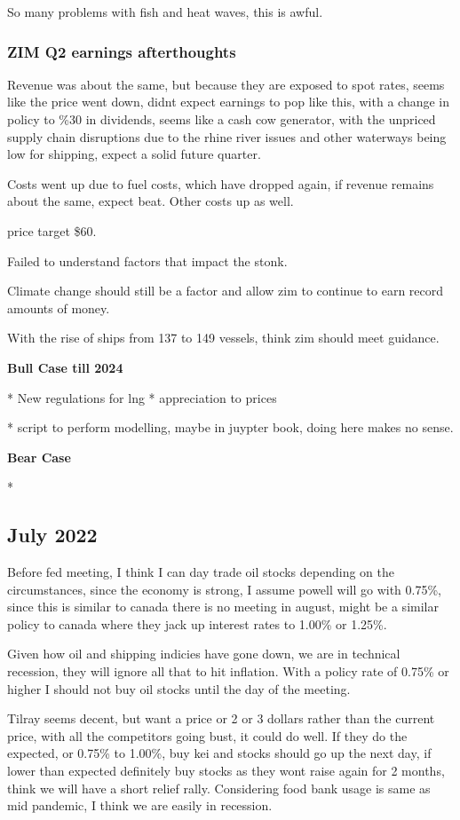 So many problems with fish and heat waves, this is awful.

\subsubsection{ZIM Q2 earnings afterthoughts} 

Revenue was about the same, but because they are exposed to spot rates, seems like the price went down, didnt expect earnings to pop like this, with a change in policy to \%30 in dividends, seems like a cash cow generator, with the unpriced supply chain disruptions due to the rhine river issues and other waterways being low for shipping, expect a solid future quarter. 

Costs went up due to fuel costs, which have dropped again, if revenue remains about the same, expect beat. Other costs up as well.

price target \$60.

Failed to understand factors that impact the stonk.

Climate change should still be a factor and allow zim to continue to earn record amounts of money.

With the rise of ships from 137 to 149 vessels, think zim should meet guidance.

\textbf{Bull Case till 2024}

* New regulations for lng
* appreciation to prices

* script to perform modelling, maybe in juypter book, doing here makes no sense.

\textbf{Bear Case}

* 
\subsection{July 2022}

Before fed meeting, I think I can day trade oil stocks depending on the circumstances, since the economy is strong, I assume powell will go with 0.75\%, since this is similar to canada there is no meeting in august, might be a similar policy to canada where they jack up interest rates to 1.00\% or 1.25\%.

Given how oil and shipping indicies have gone down, we are in technical recession, they will ignore all that to hit inflation. With a policy rate of 0.75\% or higher I should not buy oil stocks until the day of the meeting.

Tilray seems decent, but want a price or 2 or 3 dollars rather than the current price, with all the competitors going bust, it could do well. If they do the expected, or 0.75\% to 1.00\%, buy kei and stocks should go up the next day, if lower than expected definitely buy stocks as they wont raise again for 2 months, think we will have a short relief rally. Considering food bank usage is same as mid pandemic, I think we are easily in recession.


